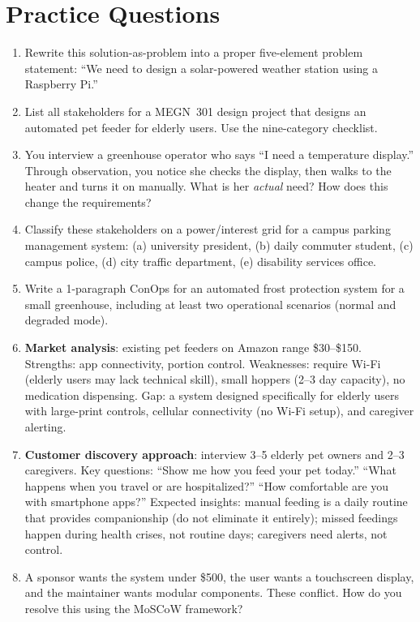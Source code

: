 \section{Practice Questions}
\begin{enumerate}[leftmargin=1.5em]
\item Rewrite this solution-as-problem into a proper five-element problem statement: ``We need to design a solar-powered weather station using a Raspberry Pi.''
\item List all stakeholders for a MEGN~301 design project that designs an automated pet feeder for elderly users. Use the nine-category checklist.
\item You interview a greenhouse operator who says ``I need a temperature display.'' Through observation, you notice she checks the display, then walks to the heater and turns it on manually. What is her \emph{actual} need? How does this change the requirements?
\item Classify these stakeholders on a power/interest grid for a campus parking management system: (a) university president, (b) daily commuter student, (c) campus police, (d) city traffic department, (e) disability services office.
\item Write a 1-paragraph ConOps for an automated frost protection system for a small greenhouse, including at least two operational scenarios (normal and degraded mode).

\item \textbf{Market analysis}: existing pet feeders on Amazon range \$30--\$150. Strengths: app connectivity, portion control. Weaknesses: require Wi-Fi (elderly users may lack technical skill), small hoppers (2--3 day capacity), no medication dispensing. Gap: a system designed specifically for elderly users with large-print controls, cellular connectivity (no Wi-Fi setup), and caregiver alerting.

\item \textbf{Customer discovery approach}: interview 3--5 elderly pet owners and 2--3 caregivers. Key questions: ``Show me how you feed your pet today.'' ``What happens when you travel or are hospitalized?'' ``How comfortable are you with smartphone apps?'' Expected insights: manual feeding is a daily routine that provides companionship (do not eliminate it entirely); missed feedings happen during health crises, not routine days; caregivers need alerts, not control.

\item A sponsor wants the system under \$500, the user wants a touchscreen display, and the maintainer wants modular components. These conflict. How do you resolve this using the MoSCoW framework?
\end{enumerate}

